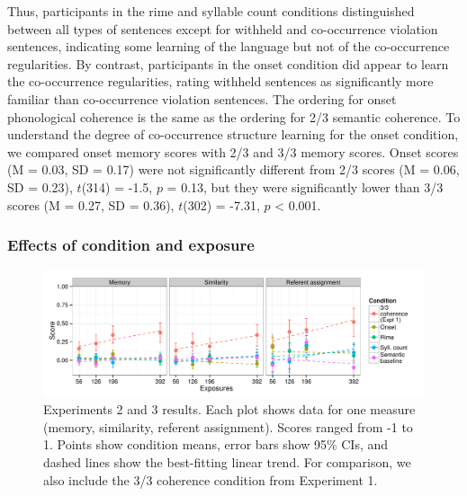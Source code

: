 \documentclass[man,floatsintext]{apa6}
\begin{document}
\noindent Thus, participants in the rime and syllable count conditions distinguished between all types of sentences except for withheld and co-occurrence violation sentences, indicating some learning of the language but not of the co-occurrence regularities. By contrast, participants in the onset condition did appear to learn the co-occurrence regularities, rating withheld sentences as significantly more familiar than co-occurrence violation sentences. The ordering for onset phonological coherence is the same as the ordering for 2/3 semantic coherence. To understand the degree of co-occurrence structure learning for the onset condition, we compared onset memory scores with 2/3 and 3/3 memory scores. Onset scores (M = 0.03, SD = 0.17) were not significantly different from 2/3 scores (M = 0.06, SD = 0.23), $t$(314) = -1.5, $p$ = 0.13, but they were significantly lower than 3/3 scores (M = 0.27, SD = 0.36), $t$(302) = -7.31, $p$ < 0.001.

\subsubsection{Effects of condition and exposure}

\begin{figure}[t]
  \begin{center}
    \includegraphics[width=1.0\linewidth]{x23}
    \caption{Experiments 2 and 3 results. Each plot shows data for one measure (memory, similarity, referent assignment). Scores ranged from -1 to 1. Points show condition means, error bars show 95\% CIs, and dashed lines show the best-fitting linear trend. For comparison, we also include the 3/3 coherence condition from Experiment 1.}
    \label{expt23-results}
  \end{center}
\end{figure}
\end{document}
